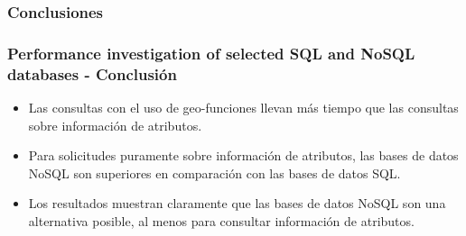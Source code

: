 \subsubsection{Conclusiones}

\begin{frame}
    \frametitle{Performance investigation of selected SQL and NoSQL databases - Conclusión}

    \begin{itemize}
        \item Las consultas con el uso de geo-funciones llevan más tiempo que las consultas sobre información de atributos.

         
        
        \item Para solicitudes puramente sobre información de atributos, las bases de datos NoSQL son superiores en comparación con las bases de datos SQL.

         
        
        \item Los resultados muestran claramente que las bases de datos NoSQL son una alternativa posible, al menos para consultar información de atributos.
    \end{itemize}
\end{frame}